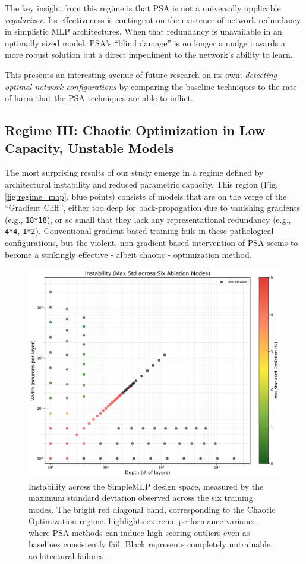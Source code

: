 \documentclass[conference]{IEEEtran}
\begin{document}
The key insight from this regime is that PSA is not a universally applicable \textit{regularizer}. Its effectiveness is contingent on the existence of network redundancy in simplistic MLP architectures. When that redundancy is unavailable in an optimally sized model, PSA's ``blind damage'' is no longer a nudge towards a more robust solution but a direct impediment to the network's ability to learn.

This presents an interesting avenue of future research on its own: \textit{detecting optimal network configurations} by comparing the baseline techniques to the rate of harm that the PSA techniques are able to inflict.

\subsection{Regime III: Chaotic Optimization in Low Capacity, Unstable Models}

The most surprising results of our study emerge in a regime defined by architectural instability and reduced parametric capacity. This region (Fig. \ref{fig:regime_map}, blue points) consists of models that are on the verge of the ``Gradient Cliff'', either too deep for back-propagation due to vanishing gradients (e.g., \verb|18*18|), or so small that they lack any representational redundancy (e.g., \verb|4*4|, \verb|1*2|). Conventional gradient-based training fails in these pathological configurations, but the violent, non-gradient-based intervention of PSA seems to become a strikingly effective - albeit chaotic - optimization method.

\begin{figure}[ht]
\centering
\includegraphics[width=\linewidth]{SimpleMLP_Heatmap_Instability.png}
\caption{Instability across the SimpleMLP design space, measured by the maximum standard deviation observed across the six training modes. The bright red diagonal band, corresponding to the Chaotic Optimization regime, highlights extreme performance variance, where PSA methods can induce high-scoring outliers even as baselines consistently fail. Black represents completely untrainable, architectural failures.}
\label{fig:heatmap_instability}
\end{figure}
\end{document}
